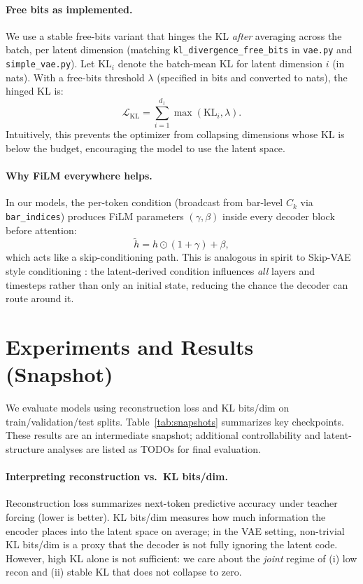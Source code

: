\documentclass[10pt]{article}
\begin{document}
\paragraph{Free bits as implemented.}
We use a stable free-bits variant that hinges the KL \emph{after} averaging across the batch, per latent dimension (matching \texttt{kl\_divergence\_free\_bits} in \texttt{vae.py} and \texttt{simple\_vae.py}). Let $\mathrm{KL}_i$ denote the batch-mean KL for latent dimension $i$ (in nats). With a free-bits threshold $\lambda$ (specified in bits and converted to nats), the hinged KL is:
\[
  \mathcal{L}_{\text{KL}} = \sum_{i=1}^{d_z} \max(\mathrm{KL}_i, \lambda).
\]
Intuitively, this prevents the optimizer from collapsing dimensions whose KL is below the budget, encouraging the model to use the latent space.

\paragraph{Why FiLM everywhere helps.}
In our models, the per-token condition (broadcast from bar-level $C_k$ via \texttt{bar\_indices}) produces FiLM parameters $(\gamma,\beta)$ inside every decoder block before attention:
\[
  \tilde{h} = h \odot (1+\gamma) + \beta,
\]
which acts like a skip-conditioning path. This is analogous in spirit to Skip-VAE style conditioning \citep{dieng2019skipvae}: the latent-derived condition influences \emph{all} layers and timesteps rather than only an initial state, reducing the chance the decoder can route around it.

\section{Experiments and Results (Snapshot)}
We evaluate models using reconstruction loss and KL bits/dim on train/validation/test splits. Table~\ref{tab:snapshots} summarizes key checkpoints. These results are an intermediate snapshot; additional controllability and latent-structure analyses are listed as TODOs for final evaluation.

\paragraph{Interpreting reconstruction vs.\ KL bits/dim.}
Reconstruction loss summarizes next-token predictive accuracy under teacher forcing (lower is better). KL bits/dim measures how much information the encoder places into the latent space on average; in the VAE setting, non-trivial KL bits/dim is a proxy that the decoder is not fully ignoring the latent code. However, high KL alone is not sufficient: we care about the \emph{joint} regime of (i) low recon and (ii) stable KL that does not collapse to zero.
\end{document}
